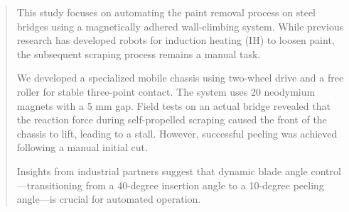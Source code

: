 \vspace*{20mm}
\renewcommand{\abstractname}{\LARGE Abstract}
\begin{abstract}
  \vspace{5mm}
  This study focuses on automating the paint removal process 
  on steel bridges using a magnetically adhered wall-climbing system. 
  While previous research has developed robots for induction heating (IH) to loosen paint, 
  the subsequent scraping process remains a manual task. 

  We developed a specialized mobile chassis using two-wheel drive 
  and a free roller for stable three-point contact. 
  The system uses 20 neodymium magnets with a 5 mm gap. 
  Field tests on an actual bridge revealed 
  that the reaction force during self-propelled scraping caused the front of the chassis to lift, 
  leading to a stall. 
  However, successful peeling was achieved following a manual initial cut. 

  Insights from industrial partners suggest that dynamic blade angle control—transitioning 
  from a 40-degree insertion angle to a 10-degree peeling angle—is crucial for automated operation.
\end{abstract}